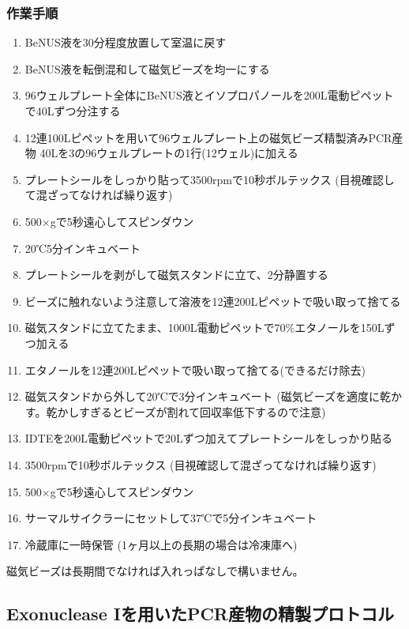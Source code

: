 \documentclass[titlepage,10pt,a4paper]{jsbook}
\begin{document}
\subsubsection{作業手順}
\begin{enumerate}
\item BeNUS液を30分程度放置して室温に戻す
\item BeNUS液を転倒混和して磁気ビーズを均一にする
\item 96ウェルプレート全体にBeNUS液とイソプロパノールを200{\textmu}L電動ピペットで40{\textmu}Lずつ分注する
\item 12連100{\textmu}Lピペットを用いて96ウェルプレート上の磁気ビーズ精製済みPCR産物 40{\textmu}Lを3の96ウェルプレートの1行(12ウェル)に加える
\item プレートシールをしっかり貼って3500rpmで10秒ボルテックス (目視確認して混ざってなければ繰り返す)
\item 500×gで5秒遠心してスピンダウン
\item 20℃5分インキュベート
\item プレートシールを剥がして磁気スタンドに立て、2分静置する
\item ビーズに触れないよう注意して溶液を12連200{\textmu}Lピペットで吸い取って捨てる
\item 磁気スタンドに立てたまま、1000{\textmu}L電動ピペットで70\%エタノールを150{\textmu}Lずつ加える
\item エタノールを12連200{\textmu}Lピペットで吸い取って捨てる(できるだけ除去)
\item 磁気スタンドから外して20℃で3分インキュベート (磁気ビーズを適度に乾かす。乾かしすぎるとビーズが割れて回収率低下するので注意)
\item IDTEを200{\textmu}L電動ピペットで20{\textmu}Lずつ加えてプレートシールをしっかり貼る
\item 3500rpmで10秒ボルテックス (目視確認して混ざってなければ繰り返す)
\item 500×gで5秒遠心してスピンダウン
\item サーマルサイクラーにセットして37℃で5分インキュベート
\item 冷蔵庫に一時保管 (1ヶ月以上の長期の場合は冷凍庫へ)
\end{enumerate}

磁気ビーズは長期間でなければ入れっぱなしで構いません。

\subsection{Exonuclease Iを用いたPCR産物の精製プロトコル}
\end{document}
